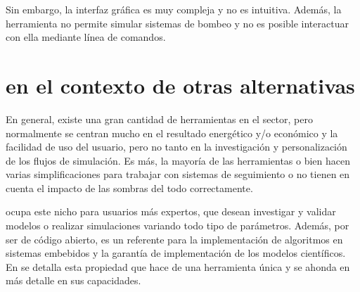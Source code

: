 Sin embargo, la interfaz gráfica es muy compleja y no es intuitiva. Además, la herramienta no permite simular sistemas de bombeo y no es posible interactuar con ella mediante línea de comandos.

\section{\pvlibpy{} en el contexto de otras alternativas}

En general, existe una gran cantidad de herramientas en el sector, pero normalmente se centran mucho en el resultado energético y/o económico y la facilidad de uso del usuario, pero no tanto en la investigación y personalización de los flujos de simulación. Es más, la mayoría de las herramientas o bien hacen varias simplificaciones para trabajar con sistemas de seguimiento o no tienen en cuenta el impacto de las sombras del todo correctamente.

\pvlibpy{} ocupa este nicho para usuarios más expertos, que desean investigar y validar modelos o realizar simulaciones variando todo tipo de parámetros. Además, por ser de código abierto, es un referente para la implementación de algoritmos en sistemas embebidos y la garantía de implementación de los modelos científicos. En  se detalla esta propiedad que hace de \pvlibpy{} una herramienta única y se ahonda en más detalle en sus capacidades.
